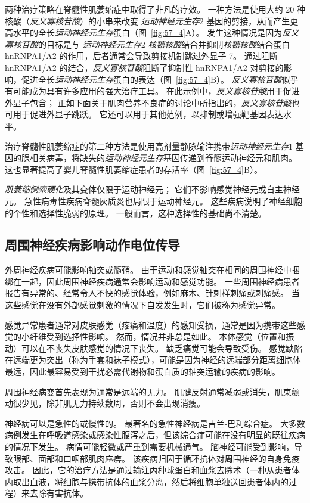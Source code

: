 两种治疗策略在脊髓性肌萎缩症中取得了非凡的疗效。
一种方法是使用大约 20 种核酸（\textit{反义寡核苷酸}）的小串来改变 \textit{运动神经元生存}2 基因的剪接，从而产生更高水平的全长\textit{运动神经元生存}蛋白（图~\ref{fig:57_4}A）。
发生这种情况是因为\textit{反义寡核苷酸}的目标是与 \textit{运动神经元生存}2 \textit{核糖核酸}结合并抑制\textit{核糖核酸}结合蛋白 hnRNPA1/A2 的作用，后者通常会导致剪接机制跳过外显子 7。
通过阻断 hnRNPA1/A2 的结合，\textit{反义寡核苷酸}阻断了抑制性 hnRNPA1/A2 对剪接的影响，促进全长\textit{运动神经元生存}蛋白的表达（图~\ref{fig:57_4}B）。
\textit{反义寡核苷酸}似乎有可能成为具有许多应用的强大治疗工具。
在此示例中，\textit{反义寡核苷酸}用于促进外显子包含；
正如下面关于肌肉营养不良症的讨论中所指出的，\textit{反义寡核苷酸}也可用于促进外显子跳跃。
它还可以用于其他范例，以抑制或增强靶基因表达水平。


治疗脊髓性肌萎缩症的第二种方法是使用高剂量静脉输注携带\textit{运动神经元生存}1 基因的腺相关病毒，将缺失的\textit{运动神经元生存}基因传递到脊髓运动神经元和肌肉。
这也显著提高了婴儿脊髓性肌萎缩症患者的存活率（图~\ref{fig:57_4}B）。


\textit{肌萎缩侧索硬化}及其变体仅限于运动神经元；
它们不影响感觉神经元或自主神经元。
急性病毒性疾病脊髓灰质炎也局限于运动神经元。
这些疾病说明了神经细胞的个性和选择性脆弱的原理。
一般而言，这种选择性的基础尚不清楚。



\subsection{周围神经疾病影响动作电位传导}

外周神经疾病可能影响轴突或髓鞘。
由于运动和感觉轴突在相同的周围神经中捆绑在一起，因此周围神经疾病通常会影响运动和感觉功能。
一些周围神经病患者报告有异常的、经常令人不快的感觉体验，例如麻木、针刺样刺痛或刺痛感。
当这些感觉在没有外部感觉刺激的情况下自发发生时，它们被称为感觉异常。


感觉异常患者通常对皮肤感觉（疼痛和温度）的感知受损，通常是因为携带这些感觉的小纤维受到选择性影响。 然而，情况并非总是如此。
本体感觉（位置和振动）可以在不丧失皮肤感觉的情况下丧失。 缺乏痛觉可能会导致受伤。
感觉缺陷在远端更为突出（称为手套和袜子模式），可能是因为神经的远端部分距离细胞体最远，因此最容易受到干扰必需代谢物和蛋白质的轴突运输的疾病的影响。


周围神经病变首先表现为通常是远端的无力。
肌腱反射通常减弱或消失，肌束颤动很少见，除非肌无力持续数周，否则不会出现消瘦。


神经病可以是急性的或慢性的。
最著名的急性神经病是吉兰-巴利综合症。
大多数病例发生在呼吸道感染或感染性腹泻之后，但该综合症可能在没有明显的既往疾病的情况下发生。
病情可能轻微或严重到需要机械通气。
脑神经可能受到影响，导致眼部、面部和口咽部肌肉麻痹。
该疾病归因于循环抗体对周围神经的自身免疫攻击。
因此，它的治疗方法是通过输注丙种球蛋白和血浆去除术（一种从患者体内取出血液，将细胞与携带抗体的血浆分离，然后将细胞单独送回患者体内的过程）来去除有害抗体。


